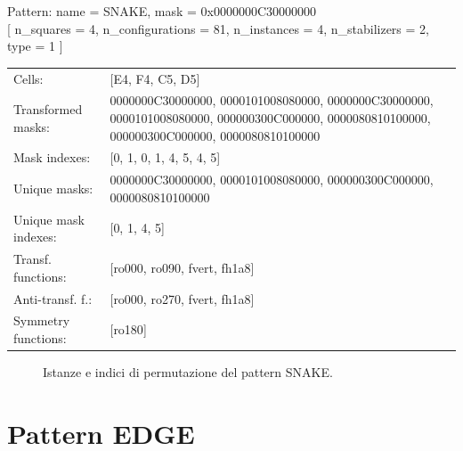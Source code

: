 \begin{tcolorbox}[sharp corners, fontupper=\ttfamily\small, colback=white]
  \noindent Pattern: name = SNAKE, mask = 0x0000000C30000000\\
  {[} n\_squares = 4, n\_configurations = 81,
  n\_instances = 4, n\_stabilizers = 2, type = 1 { ]}\\[1.0ex]
  \begin{tabularx}{\textwidth}{@{} p{3.5cm} X @{}}
    Cells:               & {[}E4, F4, C5, D5{]}\\[0.5ex]
    Transformed masks:   & 0000000C30000000, 0000101008080000, 0000000C30000000, 0000101008080000, 000000300C000000, 0000080810100000, 000000300C000000, 0000080810100000\\[0.5ex]
    Mask indexes:        & {[}0, 1, 0, 1, 4, 5, 4, 5{]}\\[0.5ex]
    Unique masks:        & 0000000C30000000, 0000101008080000, 000000300C000000, 0000080810100000\\[0.5ex]
    Unique mask indexes: & {[}0, 1, 4, 5{]}\\[0.5ex]
    Transf. functions:   & {[}ro000, ro090, fvert, fh1a8{]}\\[0.5ex]
    Anti-transf. f.:     & {[}ro000, ro270, fvert, fh1a8{]}\\[0.5ex]
    Symmetry functions:  & {[}ro180{]}\\[0.5ex]
  \end{tabularx}
\end{tcolorbox}

\begin{figure}[htbp]
  \centering
   \hfill
   \hfill
   \hfill
  \vspace{0.3cm}
   \hfill
   \hfill
   \hfill
  \caption{Istanze e indici di permutazione del pattern SNAKE.}
\end{figure}

\newpage

\section{Pattern EDGE}

